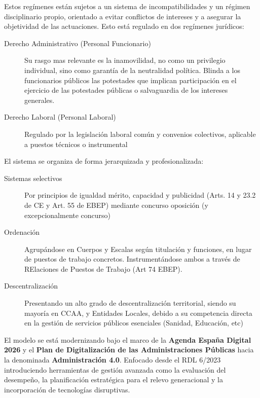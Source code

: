         Estos regímenes están sujetos a un sistema de incompatibilidades y un régimen disciplinario propio, orientado a evitar conflictos de intereses y a asegurar la objetividad de las actuaciones. Esto está regulado en dos regímenes jurídicos:
        \begin{description}
            \item[Derecho Administrativo (Personal Funcionario)] Su rasgo mas relevante es la inamovilidad, no como un privilegio individual, sino como garantía de la neutralidad política. Blinda a los funcionarios  públicos las potestades que implican participación en el ejercicio de las potestades públicas o salvaguardia de los intereses generales.
            \item[Derecho Laboral (Personal Laboral)] Regulado por la legislación laboral común y convenios colectivos, aplicable a puestos técnicos o instrumental
        \end{description}

        El sistema se organiza de forma jerarquizada y profesionalizada:
        \begin{description}
            \item[Sistemas selectivos] Por principios de igualdad mérito, capacidad y publicidad (Arts. 14 y 23.2 de CE y Art. 55 de EBEP) mediante concurso oposición (y excepcionalmente concurso)
            \item[Ordenación] Agrupándose en Cuerpos y Escalas según titulación y funciones, en lugar de puestos de trabajo concretos. Instrumentándose ambos a través de RElaciones de Puestos de Trabajo (Art 74 EBEP).
            \item[Descentralización] Presentando un alto grado de descentralización territorial, siendo su mayoría en CCAA, y Entidades Locales, debido a su competencia directa en la gestión de servicios públicos esenciales (Sanidad, Educación, etc)
        \end{description}

        El modelo se está modernizando bajo el marco de la \textbf{Agenda España Digital 2026}  y el \textbf{Plan de Digitalización de las Administraciones Públicas} hacia la denominada \textbf{Administración 4.0}. Enfocado desde el RDL 6/2023 introduciendo herramientas de gestión avanzada como la evaluación del desempeño, la planificación estratégica para el relevo generacional y la incorporación de tecnologías disruptivas.

